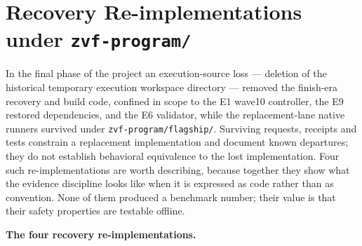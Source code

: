 \documentclass[12pt,a4paper]{report}
\begin{document}
\section{\texorpdfstring{Recovery Re-implementations under
\texttt{zvf-program/}}{Recovery Re-implementations under zvf-program/}}\label{recovery-re-implementations-under-zvf-program}

In the final phase of the project an execution-source loss --- deletion
of the historical temporary execution workspace directory --- removed
the finish-era recovery and build code, confined in scope to the E1
wave10 controller, the E9 restored dependencies, and the E6 validator,
while the replacement-lane native runners survived under
\texttt{zvf-program/flagship/}. Surviving requests, receipts and tests
constrain a replacement implementation and document known departures;
they do not establish behavioral equivalence to the lost implementation.
Four such re-implementations are worth describing, because together they
show what the evidence discipline looks like when it is expressed as
code rather than as convention. None of them produced a benchmark
number; their value is that their safety properties are testable
offline.

\textbf{The four recovery re-implementations.}
\end{document}

